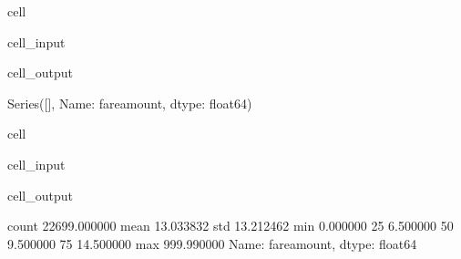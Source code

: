 \documentclass[letterpaper,10pt,english]{sphinxmanual}
\begin{document}
\begin{sphinxuseclass}{cell}
\begin{sphinxuseclass}{cell_input}
\begin{sphinxVerbatim}[commandchars=\\\{\}]
\PYG{p}{[}\PYG{p}{[}\PYG{p}{]}    \PYG{p}{]}  
\PYG{p}{[}\PYG{p}{]}\PYG{p}{[}\PYG{p}{[}\PYG{p}{]}  \PYG{p}{]}
\end{sphinxVerbatim}

\end{sphinxuseclass}
\begin{sphinxuseclass}{cell_output}
\begin{sphinxVerbatim}[commandchars=\\\{\}]
Series([], Name: fare\PYGZus{}amount, dtype: float64)
\end{sphinxVerbatim}

\end{sphinxuseclass}
\end{sphinxuseclass}
\begin{sphinxuseclass}{cell}
\begin{sphinxuseclass}{cell_input}
\begin{sphinxVerbatim}[commandchars=\\\{\}]
\PYG{p}{[}\PYG{p}{]}
\end{sphinxVerbatim}

\end{sphinxuseclass}
\begin{sphinxuseclass}{cell_output}
\begin{sphinxVerbatim}[commandchars=\\\{\}]
count    22699.000000
mean        13.033832
std         13.212462
min          0.000000
25\PYGZpc{}          6.500000
50\PYGZpc{}          9.500000
75\PYGZpc{}         14.500000
max        999.990000
Name: fare\PYGZus{}amount, dtype: float64
\end{sphinxVerbatim}

\end{sphinxuseclass}
\end{sphinxuseclass}
\end{document}
